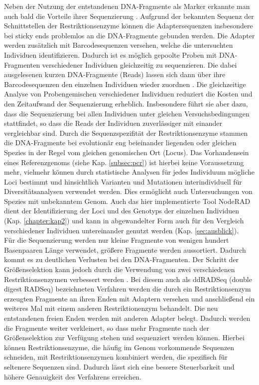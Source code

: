 Neben der Nutzung der entstandenen DNA-Fragmente als Marker erkannte man auch bald die Vorteile ihrer Sequenzierung \cite{baird_2008}. Aufgrund der bekannten Sequenz der Schnittstellen der Restriktionsenzyme können die Adaptersequenzen insbesondere bei sticky ends problemlos an die DNA-Fragmente gebunden werden. Die Adapter werden zusätzlich mit Barcodesequenzen versehen, welche die untersuchten Individuen identifizieren. Dadurch ist es möglich gepoolte Proben mit DNA-Fragmenten verschiedener Individuen gleichzeitig zu sequenzieren. Die dabei ausgelesenen kurzen DNA-Fragmente (Reads) lassen sich dann über ihre Barcodesequenzen den einzelnen Individuen wieder zuordnen \cite{davey_2010}. Die gleichzeitige Analyse von Probengemischen verschiedener Individuen reduziert die Kosten und den Zeitaufwand der Sequenzierung erheblich. Insbesondere führt sie aber dazu, dass die Sequenzierung bei allen Individuen unter gleichen Versuchsbedingungen stattfindet, so dass die Reads der Individuen zuverlässiger mit einander vergleichbar sind. Durch die Sequenzspezifität der Restriktionsenzyme stammen die DNA-Fragmente bei evolutionär eng beieinander liegenden oder gleichen Spezies in der Regel vom gleichen genomischen Ort (Locus). Das Vorhandensein eines Referenzgenoms (siehe Kap. \ref{subsec:pcr}) ist hierbei keine Voraussetzung mehr, vielmehr können durch statistische Analysen für jedes Individuum mögliche Loci bestimmt \cite{leggett_2014} und hinsichtlich Varianten und Mutationen interindividuell für Diversitätsanalysen verwendet werden. Dies ermöglicht auch Untersuchungen von Spezies mit unbekanntem Genom. Auch das hier implementierte Tool NodeRAD \cite{noderad} dient der Identifizierung der Loci und des Genotyps der einzelnen Individuen (Kap. \ref{chapter:kap2}) und kann in abgewandelter Form auch für den Vergleich verschiedener Individuen untereinander genutzt werden (Kap. \ref{sec:ausblick}).  \\

Für die Sequenzierung werden nur kleine Fragmente von wenigen hundert Basenpaaren Länge verwendet, größere Fragmente werden aussortiert. Dadurch kommt es zu deutlichen Verlusten bei den DNA-Fragmenten. Der Schritt der Größenselektion kann jedoch durch die Verwendung von zwei verschiedenen Restriktionsenzymen verbessert werden \cite{peterson_2012}. Bei diesem auch als ddRADSeq (double digest RADSeq) bezeichneten Verfahren werden die durch ein Restriktionsenzym erzeugten Fragmente an ihren Enden mit Adaptern versehen und anschließend ein weiteres Mal mit einem anderen Restriktionenzym behandelt. Die neu entstandenen freien Enden werden mit anderen Adapter belegt. Dadurch werden die Fragmente weiter verkleinert, so dass mehr Fragmente nach der Größenselektion zur Verfügung stehen und sequenziert werden können. Hierbei können Restriktionsenzyme, die häufig im Genom vorkommende Sequenzen schneiden, mit Restriktionsenzymen kombiniert werden, die spezifisch für seltenere Sequenzen sind. Dadurch lässt sich eine bessere Steuerbarkeit und  höhere Genauigkeit des Verfahrens erreichen. \\

